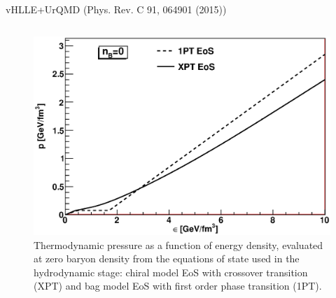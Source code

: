 \documentclass[final,hyperref={pdfpagelabels=false}, xcolor=dvipsnames]{beamer}
\begin{document}
\begin{frame}[shrink=30]
\begin{columns}[t]
 \begin{block}{vHLLE+UrQMD (Phys. Rev. C 91, 064901 (2015))}
  \begin{columns}[t]
   \begin{figure}[t]
   \caption{Thermodynamic pressure as a function of energy density, 
   evaluated at zero baryon density from the equations of state used in the hydrodynamic stage: 
   chiral model EoS with crossover transition (XPT) and bag model EoS with first order phase transition (1PT).}
         \includegraphics[width=1.01\linewidth]{eos.eps}
      \end{figure}
     

\end{columns}
\end{block}
\end{columns}
\end{frame}
\end{document}
